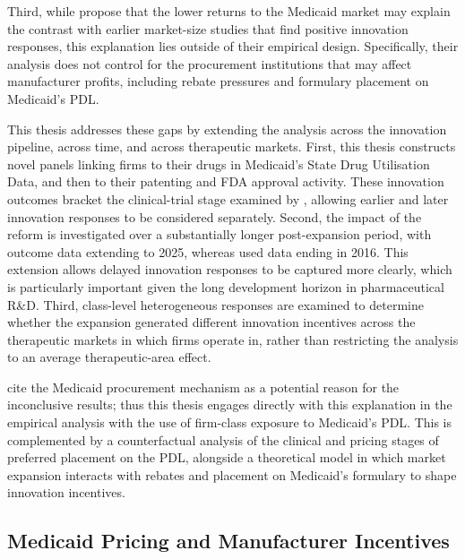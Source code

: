 \documentclass[12pt]{article}
\begin{document}
Third, while \citeauthor{NBERw28755} propose that the lower returns to the Medicaid market may explain the contrast with earlier market-size studies that find positive innovation responses, this explanation lies outside of their empirical design. Specifically, their analysis does not control for the procurement institutions that may affect manufacturer profits, including rebate pressures and formulary placement on Medicaid's PDL.

This thesis addresses these gaps by extending the analysis across the innovation pipeline, across time, and across therapeutic markets. First, this thesis constructs novel panels linking firms to their drugs in Medicaid's State Drug Utilisation Data, and then to their patenting and FDA approval activity. These innovation outcomes bracket the clinical-trial stage examined by \citeauthor{NBERw28755}, allowing earlier and later innovation responses to be considered separately. Second, the impact of the reform is investigated over a substantially longer post-expansion period, with outcome data extending to 2025, whereas \citeauthor{NBERw28755} used data ending in 2016. This extension allows delayed innovation responses to be captured more clearly, which is particularly important given the long development horizon in pharmaceutical R\&D. Third, class-level heterogeneous responses are examined to determine whether the expansion generated different innovation incentives across the therapeutic markets in which firms operate in, rather than restricting the analysis to an average therapeutic-area effect.

\citeauthor{NBERw28755} cite the Medicaid procurement mechanism as a potential reason for the inconclusive results; thus this thesis engages directly with this explanation in the empirical analysis with the use of firm-class exposure to Medicaid's PDL. This is complemented by a counterfactual analysis of the clinical and pricing stages of preferred placement on the PDL, alongside a theoretical model in which market expansion interacts with rebates and placement on Medicaid's formulary to shape innovation incentives.

\subsection{Medicaid Pricing and Manufacturer Incentives}
\end{document}
